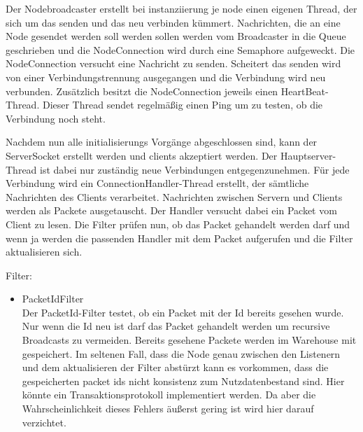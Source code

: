     Der Nodebroadcaster erstellt bei instanziierung je node einen eigenen Thread, der sich um das senden und das neu verbinden kümmert.
    Nachrichten, die an eine Node gesendet werden soll werden sollen werden vom Broadcaster in die Queue geschrieben und die NodeConnection wird durch eine Semaphore aufgeweckt. Die NodeConnection versucht eine Nachricht zu senden. Scheitert das senden wird von einer Verbindungstrennung ausgegangen und die Verbindung wird neu verbunden.
    Zusätzlich besitzt die NodeConnection jeweils einen HeartBeat-Thread. Dieser Thread sendet regelmäßig einen Ping um zu testen, ob die Verbindung noch steht.

    Nachdem nun alle initialisierungs Vorgänge abgeschlossen sind, kann der ServerSocket erstellt werden und clients akzeptiert werden.
    Der Hauptserver-Thread ist dabei nur zuständig neue Verbindungen entgegenzunehmen. Für jede Verbindung wird ein ConnectionHandler-Thread erstellt, der sämtliche Nachrichten des Clients verarbeitet.
    Nachrichten zwischen Servern und Clients werden als Packete ausgetauscht. Der Handler versucht dabei ein Packet vom Client zu lesen. Die Filter prüfen nun, ob das Packet gehandelt werden darf und wenn ja werden die passenden Handler mit dem Packet aufgerufen und die Filter aktualisieren sich.

    


    Filter:
    \begin{itemize}
        \item PacketIdFilter\\
            Der PacketId-Filter testet, ob ein Packet mit der Id bereits gesehen wurde. Nur wenn die Id neu ist darf das Packet gehandelt werden um recursive Broadcasts zu vermeiden. Bereits gesehene Packete werden im Warehouse mit gespeichert. Im seltenen Fall, dass die Node genau zwischen den Listenern und dem aktualisieren der Filter abstürzt kann es vorkommen, dass die gespeicherten packet ids nicht konsistenz zum Nutzdatenbestand sind. Hier könnte ein Transaktionsprotokoll implementiert werden. Da aber die Wahrscheinlichkeit dieses Fehlers äußerst gering ist wird hier darauf verzichtet.
    \end{itemize}
   



